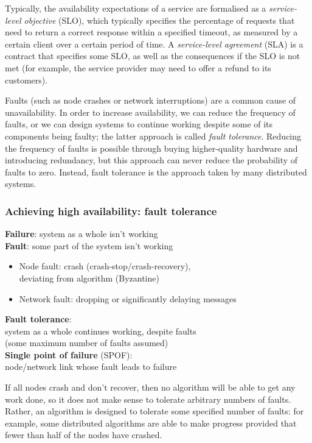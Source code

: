 Typically, the availability expectations of a service are formalised as a \emph{service-level objective} (SLO), which typically specifies the percentage of requests that need to return a correct response within a specified timeout, as measured by a certain client over a certain period of time.
A \emph{service-level agreement} (SLA) is a contract that specifies some SLO, as well as the consequences if the SLO is not met (for example, the service provider may need to offer a refund to its customers).

Faults (such as node crashes or network interruptions) are a common cause of unavailability.
In order to increase availability, we can reduce the frequency of faults, or we can design systems to continue working despite some of its components being faulty; the latter approach is called \emph{fault tolerance}.
Reducing the frequency of faults is possible through buying higher-quality hardware and introducing redundancy, but this approach can never reduce the probability of faults to zero.
Instead, fault tolerance is the approach taken by many distributed systems.

\begin{frame}
    \label{s:fault-tolerance}
    \frametitle{Achieving high availability: fault tolerance}
    \textbf{Failure}: system as a whole isn't working\\[1em]
    \textbf{Fault}: some part of the system isn't working
    \begin{itemize}
        \item Node fault: crash (crash-stop/crash-recovery),\\deviating from algorithm (Byzantine)
        \item Network fault: dropping or significantly delaying messages\\[1em]
    \end{itemize}
    \textbf{Fault tolerance}:\\system as a whole continues working, despite faults\\
    (some maximum number of faults assumed)\\[1em]
    \textbf{Single point of failure} (SPOF):\\ node/network link whose fault leads to failure
\end{frame}
\label{l:fault-tolerance}

If all nodes crash and don't recover, then no algorithm will be able to get any work done, so it does not make sense to tolerate arbitrary numbers of faults.
Rather, an algorithm is designed to tolerate some specified number of faults: for example, some distributed algorithms are able to make progress provided that fewer than half of the nodes have crashed.

